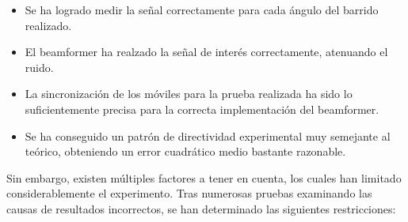 \documentclass[a4paper,11pt]{book}
\begin{document}
\begin{itemize}

\item Se ha logrado medir la señal correctamente para cada ángulo del barrido realizado.

\item El beamformer ha realzado la señal de interés correctamente, atenuando el ruido.

\item La sincronización de los móviles para la prueba realizada ha sido lo suficientemente precisa para la correcta implementación del beamformer.

\item Se ha conseguido un patrón de directividad experimental muy semejante al teórico, obteniendo un error cuadrático medio bastante razonable.

\end{itemize}

Sin embargo, existen múltiples factores a tener en cuenta, los cuales han limitado considerablemente el experimento. Tras numerosas pruebas examinando las causas de resultados incorrectos, se han determinado las siguientes restricciones:
\end{document}
